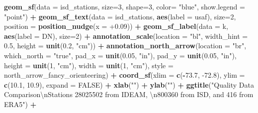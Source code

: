 \documentclass[12pt,oneside]{reedthesis}
\newenvironment{Shaded}{\begin{snugshade}}{\end{snugshade}}
\newcommand{\CharTok}[1]{\textcolor[rgb]{0.31,0.60,0.02}{#1}}
\newcommand{\DataTypeTok}[1]{\textcolor[rgb]{0.13,0.29,0.53}{#1}}
\newcommand{\DecValTok}[1]{\textcolor[rgb]{0.00,0.00,0.81}{#1}}
\newcommand{\FloatTok}[1]{\textcolor[rgb]{0.00,0.00,0.81}{#1}}
\newcommand{\KeywordTok}[1]{\textcolor[rgb]{0.13,0.29,0.53}{\textbf{#1}}}
\newcommand{\NormalTok}[1]{#1}
\newcommand{\OperatorTok}[1]{\textcolor[rgb]{0.81,0.36,0.00}{\textbf{#1}}}
\newcommand{\OtherTok}[1]{\textcolor[rgb]{0.56,0.35,0.01}{#1}}
\newcommand{\StringTok}[1]{\textcolor[rgb]{0.31,0.60,0.02}{#1}}
\begin{document}
\begin{Shaded}
\begin{Highlighting}[]
{{{{\StringTok{  }\KeywordTok{geom_sf}\NormalTok{(}\DataTypeTok{data =}\NormalTok{ isd_stations, }\DataTypeTok{size=}\DecValTok{3}\NormalTok{, }\DataTypeTok{shape=}\DecValTok{3}\NormalTok{, }\DataTypeTok{color=} \StringTok{"blue"}\NormalTok{, }\DataTypeTok{show.legend =} \StringTok{"point"}\NormalTok{) }\OperatorTok{+}
\StringTok{  }\KeywordTok{geom_sf_text}\NormalTok{(}\DataTypeTok{data =}\NormalTok{ isd_stations, }\KeywordTok{aes}\NormalTok{(}\DataTypeTok{label =}\NormalTok{ usaf), }\DataTypeTok{size=}\DecValTok{2}\NormalTok{, }\DataTypeTok{position =} \KeywordTok{position_nudge}\NormalTok{(}\DataTypeTok{x =} \FloatTok{+0.09}\NormalTok{)) }\OperatorTok{+}
\StringTok{  }\KeywordTok{geom_sf_label}\NormalTok{(}\DataTypeTok{data =}\NormalTok{ k, }\KeywordTok{aes}\NormalTok{(}\DataTypeTok{label =}\NormalTok{ DN), }\DataTypeTok{size=}\DecValTok{2}\NormalTok{) }\OperatorTok{+}
\StringTok{  }\KeywordTok{annotation_scale}\NormalTok{(}\DataTypeTok{location =} \StringTok{"bl"}\NormalTok{, }\DataTypeTok{width_hint =} \FloatTok{0.5}\NormalTok{, }\DataTypeTok{height =} \KeywordTok{unit}\NormalTok{(}\FloatTok{0.2}\NormalTok{, }\StringTok{"cm"}\NormalTok{)) }\OperatorTok{+}
\StringTok{  }\KeywordTok{annotation_north_arrow}\NormalTok{(}\DataTypeTok{location =} \StringTok{"br"}\NormalTok{, }\DataTypeTok{which_north =} \StringTok{"true"}\NormalTok{, }\DataTypeTok{pad_x =} \KeywordTok{unit}\NormalTok{(}\FloatTok{0.05}\NormalTok{, }\StringTok{"in"}\NormalTok{), }\DataTypeTok{pad_y =} \KeywordTok{unit}\NormalTok{(}\FloatTok{0.05}\NormalTok{, }\StringTok{"in"}\NormalTok{), }\DataTypeTok{height =} \KeywordTok{unit}\NormalTok{(}\DecValTok{1}\NormalTok{, }\StringTok{"cm"}\NormalTok{), }
   \DataTypeTok{width =} \KeywordTok{unit}\NormalTok{(}\DecValTok{1}\NormalTok{, }\StringTok{"cm"}\NormalTok{), }\DataTypeTok{style =}\NormalTok{ north_arrow_fancy_orienteering) }\OperatorTok{+}
\StringTok{  }\KeywordTok{coord_sf}\NormalTok{(}\DataTypeTok{xlim =} \KeywordTok{c}\NormalTok{(}\OperatorTok{-}\FloatTok{73.7}\NormalTok{, }\FloatTok{-72.8}\NormalTok{), }\DataTypeTok{ylim =} \KeywordTok{c}\NormalTok{(}\FloatTok{10.1}\NormalTok{, }\FloatTok{10.9}\NormalTok{), }\DataTypeTok{expand =} \OtherTok{FALSE}\NormalTok{) }\OperatorTok{+}
\StringTok{  }\KeywordTok{xlab}\NormalTok{(}\StringTok{""}\NormalTok{) }\OperatorTok{+}\StringTok{ }
\StringTok{  }\KeywordTok{ylab}\NormalTok{(}\StringTok{""}\NormalTok{) }\OperatorTok{+}\StringTok{ }
\StringTok{  }\KeywordTok{ggtitle}\NormalTok{(}\StringTok{"Quality Data Comparison}\CharTok{\textbackslash{}n}\StringTok{Stations 28025502 from IDEAM, }\CharTok{\textbackslash{}n}\StringTok{800360 from ISD, and 416 from ERA5"}\NormalTok{) }\OperatorTok{+}
}}}}
\end{Highlighting}
\end{Shaded}
\end{document}
